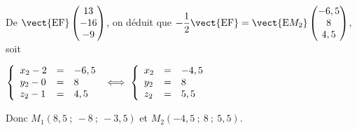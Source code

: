 \begin{enumerate}[resume]
De $\vect{\text{EF}}\begin{pmatrix}13\\-16\\-9\end{pmatrix}$, on déduit que $-\dfrac12 \vect{\text{EF}} = \vect{\text{E}M_2}\begin{pmatrix}-6,5\\8\\4,5\end{pmatrix}$, soit 

$\left\{\begin{array}{l c l}
x_2 - 2&=&-6,5\\
y_2 - 0&=& 8\\
z_2 - 1&=&4,5
\end{array}\right. \iff \left\{\begin{array}{l c l}
x_2 &=&- 4,5\\
y_2 &=& 8\\
z_2 &=&5,5
\end{array}\right.$

Donc $M_1(8,5~;~-8~;~- 3,5)$ et $M_2(-4,5~;~ 8~;~5,5)$.
\end{enumerate}
